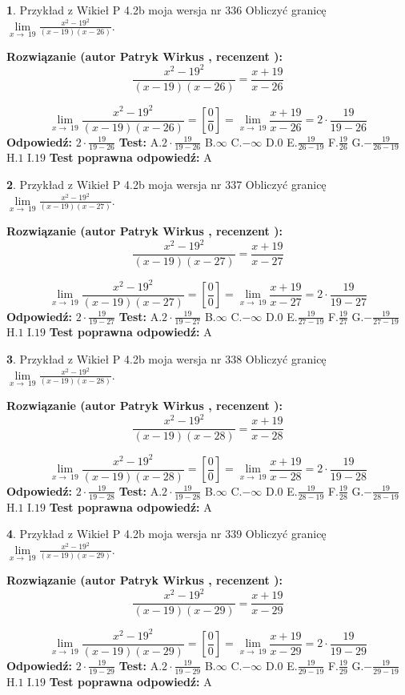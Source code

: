 \documentclass[12pt, a4paper]{article}
\theoremstyle{definition} %
\newtheorem{zad}{}
\newcommand{\zadStart}[1]{\begin{zad}#1\newline}
\newcommand{\zadStop}{\end{zad}}
\newcommand{\rozwStart}[2]{\noindent \textbf{Rozwiązanie (autor #1 , recenzent #2): }\newline}
\newcommand{\rozwStop}{\newline}
\newcommand{\odpStart}{\noindent \textbf{Odpowiedź:}\newline}
\newcommand{\odpStop}{\newline}
\newcommand{\testStart}{\noindent \textbf{Test:}\newline}
\newcommand{\testStop}{\newline}
\newcommand{\kluczStart}{\noindent \textbf{Test poprawna odpowiedź:}\newline}
\newcommand{\kluczStop}{\newline}
\begin{document}
\zadStart{Przykład z Wikieł P 4.2b moja wersja nr 336}
Obliczyć granicę $\lim\limits_{x\to\ 19}\frac{x^{2}-19^{2}}{(x-19)(x-26)}$.
\zadStop
\rozwStart{Patryk Wirkus}{}
$$\frac{x^{2}-19^{2}}{(x-19)(x-26)}=\frac{x+19}{x-26}$$

$$\lim\limits_{x\to\ 19}\frac{x^{2}-19^{2}}{(x-19)(x-26)}=[\frac{0}{0}]=\lim\limits_{x\to\ 19}\frac{x+19}{x-26}=2 \cdot \frac{19}{19-26}$$
\rozwStop
\odpStart
$2 \cdot \frac{19}{19-26}$
\odpStop
\testStart
A.$2 \cdot \frac{19}{19-26}$
B.$\infty$
C.$-\infty$
D.$0$
E.$\frac{19}{26-19}$
F.$\frac{19}{26}$
G.$-\frac{19}{26-19}$
H.$1$
I.$19$
\testStop
\kluczStart
A
\kluczStop



\zadStart{Przykład z Wikieł P 4.2b moja wersja nr 337}
Obliczyć granicę $\lim\limits_{x\to\ 19}\frac{x^{2}-19^{2}}{(x-19)(x-27)}$.
\zadStop
\rozwStart{Patryk Wirkus}{}
$$\frac{x^{2}-19^{2}}{(x-19)(x-27)}=\frac{x+19}{x-27}$$

$$\lim\limits_{x\to\ 19}\frac{x^{2}-19^{2}}{(x-19)(x-27)}=[\frac{0}{0}]=\lim\limits_{x\to\ 19}\frac{x+19}{x-27}=2 \cdot \frac{19}{19-27}$$
\rozwStop
\odpStart
$2 \cdot \frac{19}{19-27}$
\odpStop
\testStart
A.$2 \cdot \frac{19}{19-27}$
B.$\infty$
C.$-\infty$
D.$0$
E.$\frac{19}{27-19}$
F.$\frac{19}{27}$
G.$-\frac{19}{27-19}$
H.$1$
I.$19$
\testStop
\kluczStart
A
\kluczStop



\zadStart{Przykład z Wikieł P 4.2b moja wersja nr 338}
Obliczyć granicę $\lim\limits_{x\to\ 19}\frac{x^{2}-19^{2}}{(x-19)(x-28)}$.
\zadStop
\rozwStart{Patryk Wirkus}{}
$$\frac{x^{2}-19^{2}}{(x-19)(x-28)}=\frac{x+19}{x-28}$$

$$\lim\limits_{x\to\ 19}\frac{x^{2}-19^{2}}{(x-19)(x-28)}=[\frac{0}{0}]=\lim\limits_{x\to\ 19}\frac{x+19}{x-28}=2 \cdot \frac{19}{19-28}$$
\rozwStop
\odpStart
$2 \cdot \frac{19}{19-28}$
\odpStop
\testStart
A.$2 \cdot \frac{19}{19-28}$
B.$\infty$
C.$-\infty$
D.$0$
E.$\frac{19}{28-19}$
F.$\frac{19}{28}$
G.$-\frac{19}{28-19}$
H.$1$
I.$19$
\testStop
\kluczStart
A
\kluczStop



\zadStart{Przykład z Wikieł P 4.2b moja wersja nr 339}
Obliczyć granicę $\lim\limits_{x\to\ 19}\frac{x^{2}-19^{2}}{(x-19)(x-29)}$.
\zadStop
\rozwStart{Patryk Wirkus}{}
$$\frac{x^{2}-19^{2}}{(x-19)(x-29)}=\frac{x+19}{x-29}$$

$$\lim\limits_{x\to\ 19}\frac{x^{2}-19^{2}}{(x-19)(x-29)}=[\frac{0}{0}]=\lim\limits_{x\to\ 19}\frac{x+19}{x-29}=2 \cdot \frac{19}{19-29}$$
\rozwStop
\odpStart
$2 \cdot \frac{19}{19-29}$
\odpStop
\testStart
A.$2 \cdot \frac{19}{19-29}$
B.$\infty$
C.$-\infty$
D.$0$
E.$\frac{19}{29-19}$
F.$\frac{19}{29}$
G.$-\frac{19}{29-19}$
H.$1$
I.$19$
\testStop
\kluczStart
A
\kluczStop
\end{document}

